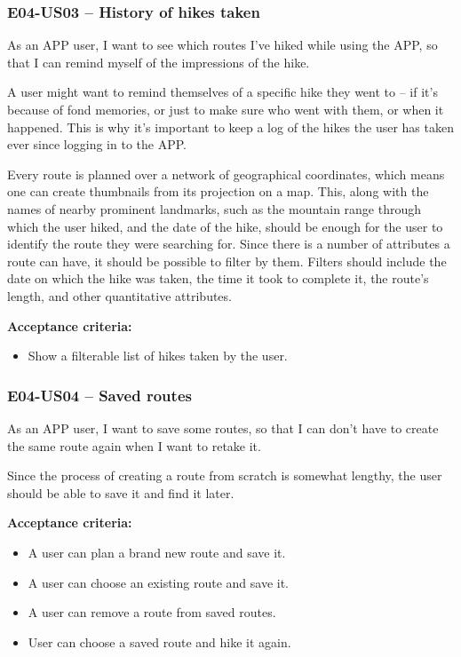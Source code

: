 \subsubsection*{E04-US03 -- History of hikes taken}
As an APP user, I want to see which routes I've hiked while using the APP, so that I can remind myself of the impressions of the hike.

A user might want to remind themselves of a specific hike they went to -- if it's because of fond memories, or just to make sure who went with them, or when it happened.
This is why it's important to keep a log of the hikes the user has taken ever since logging in to the APP.

Every route is planned over a network of geographical coordinates, which means one can create thumbnails from its projection on a map.
This, along with the names of nearby prominent landmarks, such as the mountain range through which the user hiked, and the date of the hike, should be enough for the user to identify the route they were searching for.
Since there is a number of attributes a route can have, it should be possible to filter by them.
Filters should include the date on which the hike was taken, the time it took to complete it, the route's length, and other quantitative attributes.

\textbf{Acceptance criteria:}
\begin{itemize}
    \item Show a filterable list of hikes taken by the user.
\end{itemize}

\subsubsection*{E04-US04 -- Saved routes}
As an APP user, I want to save some routes, so that I can don't have to create the same route again when I want to retake it.

Since the process of creating a route from scratch is somewhat lengthy, the user should be able to save it and find it later.

\textbf{Acceptance criteria:}
\begin{itemize}
    \item A user can plan a brand new route and save it.
    \item A user can choose an existing route and save it.
    \item A user can remove a route from saved routes.
    \item User can choose a saved route and hike it again.
\end{itemize}

